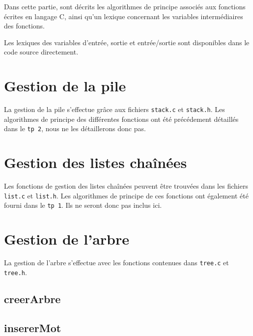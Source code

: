 Dans cette partie, sont décrits les algorithmes de principe associés aux fonctions écrites en langage C, ainsi qu'un lexique concernant les variables intermédiaires des fonctions.

Les lexiques des variables d'entrée, sortie et entrée/sortie sont disponibles dans le code source directement.

\section{Gestion de la pile}
  La gestion de la pile s'effectue grâce aux fichiers \texttt{stack.c} et \texttt{stack.h}.
  Les algorithmes de principe des différentes fonctions ont été précédement détaillés dans le \texttt{tp 2}, nous ne les détaillerons donc pas.

\section{Gestion des listes chaînées}
  Les fonctions de gestion des listes chaînées peuvent être trouvées dans les fichiers \texttt{list.c} et \texttt{list.h}.
  Les algorithmes de principe de ces fonctions ont également été fourni dans le \texttt{tp 1}. Ils ne seront donc pas inclus ici.

\section{Gestion de l'arbre}
  La gestion de l'arbre s'effectue avec les fonctions contenues dans \texttt{tree.c} et \texttt{tree.h}.
    
  \newpage
  \subsection{creerArbre}
    \begin{algo}[informal] %
      \BEGIN
        \RETURN{}
      \END
    \end{algo}

    \begin{algo}[informal] %
      \VAR
        \DECLVAR{}{}
      \ENDVAR
    \end{algo}

  \subsection{insererMot}
    \begin{algo}[informal] %
      \BEGIN
        \RETURN{}
      \END
    \end{algo}


